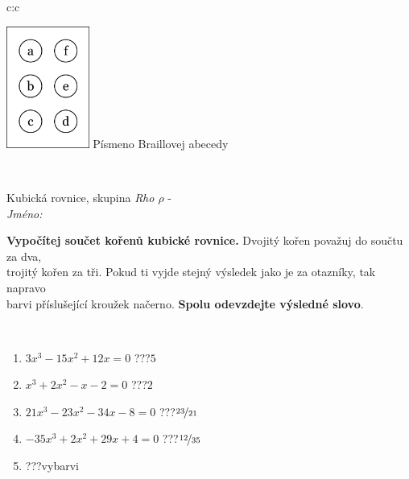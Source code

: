 \documentclass[10pt]{report}
\begin{document}
\begin{tabular}{c:c}
\begin{minipage}[c][104.5mm][t]{0.5\linewidth}
\begin{center}
\begin{minipage}{0.20\linewidth}
\begin{center}
\includegraphics[height=40mm]{../images/braille.png}
{\small Písmeno Braillovej abecedy}
\end{center}
\end{minipage}
\end{center}
\end{minipage}
\\ \hdashline
\begin{minipage}[c][104.5mm][t]{0.5\linewidth}
\begin{center}
\vspace{7mm}
{\huge Kubická rovnice, skupina \textit{Rho $\rho$} -}\\[5mm]
\textit{Jméno:}\phantom{xxxxxxxxxxxxxxxxxxxxxxxxxxxxxxxxxxxxxxxxxxxxxxxxxxxxxxxxxxxxxxxxx}\\[5mm]
\begin{minipage}{0.95\linewidth}
\begin{center}
\textbf{Vypočítej součet kořenů kubické rovnice.} Dvojitý kořen považuj do součtu za dva,\\trojitý kořen za tři. Pokud ti vyjde stejný výsledek jako je za otazníky, tak napravo\\barvi příslušející kroužek načerno. \textbf{Spolu odevzdejte výsledné slovo}.
\end{center}
\end{minipage}
\\[1mm]
\begin{minipage}{0.79\linewidth}
\begin{center}
\begin{varwidth}{\linewidth}
\begin{enumerate}
\Large
\item $3x^3-15x^2+12x=0$\quad \dotfill\; ???\;\dotfill \quad $5$
\item $x^3+2x^2-x-2=0$\quad \dotfill\; ???\;\dotfill \quad $2$
\item $21x^3-23x^2-34x-8=0$\quad \dotfill\; ???\;\dotfill \quad $\nicefrac{23}{21}$
\item $-35x^3+2x^2+29x+4=0$\quad \dotfill\; ???\;\dotfill \quad $\nicefrac{12}{35}$
\item \quad \dotfill\; ???\;\dotfill \quad vybarvi

\end{enumerate}
\end{varwidth}
\end{center}
\end{minipage}
\end{center}
\end{minipage}
\end{tabular}
\end{document}
